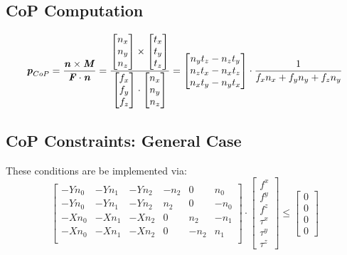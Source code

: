 \subsection{CoP Computation}
\begin{equation}
\bm{\mathit{p}}_{CoP} = \dfrac{\bm{\mathit{n}}\times\bm{\mathit{M}}}{\bm{\mathit{F}}\cdot\bm{\mathit{n}}} = \dfrac{\begin{bmatrix} n_x \\ n_y \\ n_z \end{bmatrix} \times \begin{bmatrix} t_x \\ t_y \\ t_z \end{bmatrix}}{\begin{bmatrix} f_x \\ f_y \\ f_z \end{bmatrix} \cdot \begin{bmatrix} n_x \\ n_y \\ n_z \end{bmatrix}} = 
\begin{bmatrix} n_yt_z - n_zt_y \\ n_zt_x-n_xt_z \\ n_xt_y-n_yt_x \end{bmatrix}\cdot \dfrac{1}{f_xn_x+f_yn_y+f_zn_y}
\end{equation}

\subsection{CoP Constraints: General Case}
These conditions are be implemented via: 
\begin{equation}
\begin{bmatrix} -Yn_0 & -Yn_1 & -Yn_2 & -n_2 & 0 & n_0 \\
-Yn_0 & -Yn_1 & -Yn_2 & n_2 & 0 & -n_0 \\
-Xn_0 & -Xn_1 & -Xn_2 & 0 & n_2 & -n_1 \\
-Xn_0 & -Xn_1 & -Xn_2 & 0 & -n_2 & n_1 \\ \end{bmatrix} \cdot
\begin{bmatrix} f^x \\ f^y \\ f^z \\ \tau^x \\ \tau^y \\ \tau^z \end{bmatrix} \leq
\begin{bmatrix} 0 \\ 0 \\ 0 \\ 0 \end{bmatrix}
\end{equation}

